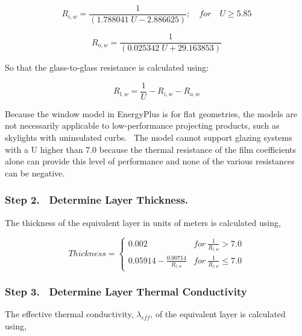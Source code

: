 \begin{equation}
{R_{i,w}} = \frac{1}{{(1.788041\;U - 2.886625)}};\quad for\quad U \ge 5.85
\end{equation}

\begin{equation}
{R_{o,w}} = \frac{1}{{(0.025342\;U + 29.163853)}}
\end{equation}

So that the glass-to-glass resistance is calculated using:

\begin{equation}
{R_{l,w}} = \frac{1}{U} - {R_{i,w}} - {R_{o,w}}
\end{equation}

Because the window model in EnergyPlus is for flat geometries, the models are not necessarily applicable to low-performance projecting products, such as skylights with uninsulated curbs.~ The model cannot support glazing systems with a U higher than 7.0 because the thermal resistance of the film coefficients alone can provide this level of performance and none of the various resistances can be negative.

\subsubsection{Step 2.~ Determine Layer Thickness.}\label{step-2.-determine-layer-thickness.}

The thickness of the equivalent layer in units of meters is calculated using,

\begin{equation}
  Thickness = \left\{
                \begin{array}{cl}
                  0.002                             & for~\frac{1}{R_{l,w}} > 7.0 \\
                  0.05914 - \frac{0.00714}{R_{l,w}} & for~\frac{1}{R_{l,w}} \leq 7.0
                \end{array}
              \right.
\end{equation}

\subsubsection{Step 3.~ Determine Layer Thermal Conductivity}\label{step-3.-determine-layer-thermal-conductivity}

The effective thermal conductivity, \({\lambda_{eff}}\), of the equivalent layer is calculated using,

